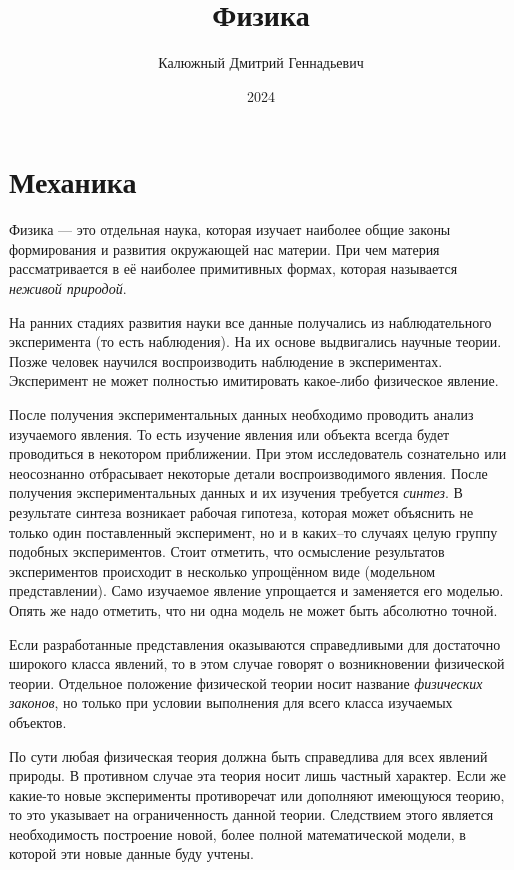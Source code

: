 \documentclass[10pt]{extbook}
\title{Физика}
\author{Калюжный Дмитрий Геннадьевич}
\date{2024}
\begin{document}
\frontmatter

\maketitle
\tableofcontents
\newpage

\mainmatter

\chapter{Механика}%

Физика --- это отдельная наука, которая изучает наиболее общие законы
формирования и развития окружающей нас материи. При чем материя рассматривается
в её наиболее примитивных формах, которая называется \emph{неживой природой}.

На ранних стадиях развития науки все данные получались из наблюдательного
эксперимента (то есть наблюдения). На их основе выдвигались научные теории.
Позже человек научился воспроизводить наблюдение в экспериментах. Эксперимент
не может полностью имитировать какое-либо физическое явление.

После получения экспериментальных данных необходимо проводить анализ изучаемого
явления. То есть изучение явления или объекта всегда будет проводиться в
некотором приближении. При этом исследователь сознательно или неосознанно
отбрасывает некоторые детали воспроизводимого явления. После получения
экспериментальных данных и их изучения требуется \emph{синтез}. В результате
синтеза возникает рабочая гипотеза, которая может объяснить не только один
поставленный эксперимент, но и в каких--то случаях целую группу подобных
экспериментов. Стоит отметить, что осмысление результатов экспериментов
происходит в несколько упрощённом виде (модельном представлении). Само
изучаемое явление упрощается и заменяется его моделью. Опять же надо отметить,
что ни одна модель не может быть абсолютно точной.

Если разработанные представления оказываются справедливыми для достаточно
широкого класса явлений, то в этом случае говорят о возникновении физической
теории. Отдельное положение физической теории носит название \emph{физических
	законов}, но только при условии выполнения для всего класса изучаемых объектов.

По сути любая физическая теория должна быть справедлива для всех явлений
природы. В противном случае эта теория носит лишь частный характер. Если же
какие-то новые эксперименты противоречат или дополняют имеющуюся теорию, то
это указывает на ограниченность данной теории. Следствием этого является
необходимость построение новой, более полной математической модели, в
которой эти новые данные буду учтены.
\end{document}
